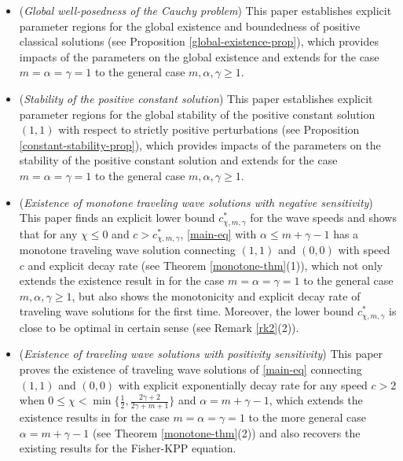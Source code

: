 \documentclass[11pt]{article} %
\theoremstyle{remark}
\theoremstyle{remark}
\numberwithin{equation}{section}
\numberwithin{figure}{section}
\numberwithin{table}{section}
\begin{document}
\begin{itemize}

\item ({\it Global well-posedness of the Cauchy problem})  This paper establishes  explicit parameter regions for the global existence and boundedness of positive classical solutions  (see Proposition \ref{global-existence-prop}),
which provides  impacts of the parameters on the global existence and
extends \cite[Theorem 1.4]{HaShZh2024}  for the case $m=\alpha=\gamma=1$ to the general case $m,\alpha,\gamma\ge 1$.


\item ({\it Stability of the positive constant solution}) This paper  establishes explicit  parameter regions for the global stability of 
the positive constant solution $(1,1)$ with respect to strictly positive perturbations (see Proposition \ref{constant-stability-prop}), which   provides   impacts of the parameters on the stability of the positive constant solution and extends \cite[Theorem B]{SaSh2019} for the case $m=\alpha=\gamma=1$ to the general case $m,\alpha,\gamma\ge 1$.



\item ({\it Existence of monotone traveling wave solutions with negative sensitivity})
This paper finds an explicit lower bound $c^{*}_{\chi,m,\gamma}$ for the wave speeds and shows that
for any $\chi\le 0$ and $c>c^{*}_{\chi,m,\gamma}$, \eqref{main-eq} with $\alpha\le m+\gamma-1$  has a monotone traveling wave solution
connecting $(1,1)$ and $(0,0)$ with speed $c$ and explicit decay rate (see Theorem \ref{monotone-thm}(1)), which not only extends the existence result in  \cite[Theorem A]{SaSh2020}  for the case $m=\alpha=\gamma=1$ to the general case $m,\alpha,\gamma\ge 1$, but also shows the monotonicity and explicit decay rate
of traveling wave solutions for the first time. Moreover, the lower bound $c^*_{\chi,m,\gamma}$ is close to be optimal in certain sense (see Remark \ref{rk2}(2)).



\item ({\it Existence of traveling wave solutions with positivity sensitivity})  This paper proves   the existence of traveling wave solutions of \eqref{main-eq} connecting $(1,1)$ and $(0,0)$ with  explicit exponentially decay rate for any speed  $c>2$ 
when $0\le \chi<\min\{\frac{1}{2},\frac{2\gamma+2}{2\gamma+m+1}\}$ and $\alpha=m+\gamma-1$,
 which   extends the existence results in \cite[Theorem 1.2]{SaShXu2019} for the case $m=\alpha=\gamma=1$ to the more general case $\alpha=m+\gamma-1$ (see
Theorem \ref{monotone-thm}(2)) and also recovers the existing  results for the Fisher-KPP equation.



\end{itemize}
\end{document}
